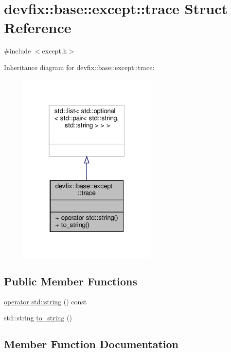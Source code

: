 \hypertarget{structdevfix_1_1base_1_1except_1_1trace}{}\section{devfix\+:\+:base\+:\+:except\+:\+:trace Struct Reference}
\label{structdevfix_1_1base_1_1except_1_1trace}


{\ttfamily \#include $<$except.\+h$>$}



Inheritance diagram for devfix\+:\+:base\+:\+:except\+:\+:trace\+:\nopagebreak
\begin{figure}[H]
\begin{center}
\leavevmode
\includegraphics[width=196pt]{structdevfix_1_1base_1_1except_1_1trace__inherit__graph}
\end{center}
\end{figure}
\subsection*{Public Member Functions}
\begin{DoxyCompactItemize}
\item 
\hyperlink{structdevfix_1_1base_1_1except_1_1trace_af3faf9e60f8190524e9cb5f529ee3fc4}{operator std\+::string} () const
\item 
std\+::string \hyperlink{structdevfix_1_1base_1_1except_1_1trace_a8adac52a0781afcb7a399fb6b743f115}{to\+\_\+string} ()
\end{DoxyCompactItemize}


\subsection{Member Function Documentation}
\mbox{\label{structdevfix_1_1base_1_1except_1_1trace_af3faf9e60f8190524e9cb5f529ee3fc4}} 
